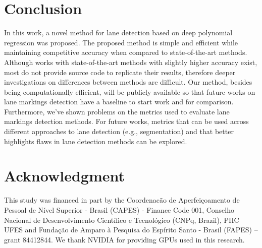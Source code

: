\documentclass[a4paper,conference]{IEEEtran}
\begin{document}
 \section{Conclusion}
In this work, a novel method for lane detection based on deep polynomial regression was proposed. The proposed method is simple and efficient while maintaining competitive accuracy when compared to state-of-the-art methods. Although works with state-of-the-art methods with slightly higher accuracy exist, most do not provide source code to replicate their results, therefore deeper investigations on differences between methods are difficult. Our method, besides being computationally efficient, will be publicly available so that future works on lane markings detection have a baseline to start work and for comparison. Furthermore, we've shown problems on the metrics used to evaluate lane markings detection methods. For future works, metrics that can be used across different approaches to lane detection (e.g., segmentation) and that better highlights flaws in lane detection methods can be explored. \section*{Acknowledgment}
This study was financed in part by the Coordenacão de Aperfeiçoamento de Pessoal de Nível Superior - Brasil (CAPES) - Finance Code 001, Conselho Nacional de Desenvolvimento Científico e Tecnológico (CNPq, Brazil), PIIC UFES and Fundação de Amparo à Pesquisa do Espírito Santo - Brasil (FAPES) – grant 84412844. We thank NVIDIA for providing GPUs used in this research.
 
\balance



\end{document}
